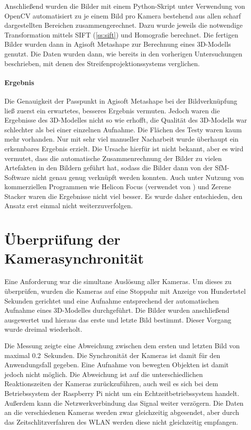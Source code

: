 \documentclass[./00PhotoBox.tex]{subfiles}
\begin{document}
Anschließend wurden die Bilder mit einem Python-Skript unter Verwendung von OpenCV automatisiert zu je einem Bild pro Kamera bestehend aus allen scharf dargestellten Bereichen zusammengerechnet. Dazu wurde jeweils die notwendige Transformation mittels \Gls{SIFT} (\autoref{ss:sift}) und \Gls{Homografie} berechnet. Die fertigen Bilder wurden dann in Agisoft Metashape zur Berechnung eines 3D-Modells genutzt. Die Daten wurden dann, wie bereits in den vorherigen Untersuchungen beschrieben, mit denen des Streifenprojektionssystems verglichen.

\paragraph{Ergebnis}
Die Genauigkeit der Passpunkt in Agisoft Metashape bei der Bildverknüpfung ließ zuerst ein erwartetes, besseres Ergebnis vermuten. Jedoch waren die Ergebnisse des 3D-Modelles nicht so wie erhofft, die Qualität des 3D-Modells war schlechter als bei einer einzelnen Aufnahme. Die Flächen des Testy waren kaum mehr vorhanden. Nur mit sehr viel manueller Nacharbeit wurde überhaupt ein erkennbares Ergebnis erzielt. Die Ursache hierfür ist nicht bekannt, aber es wird vermutet, dass die automatische Zusammenrechnung der Bilder zu vielen Artefakten in den Bildern geführt hat, sodass die Bilder dann von der \Gls{SfM}-Software nicht genau genug verknüpft werden konnten. Auch unter Nutzung von kommerziellen Programmen wie Helicon Focus (verwendet von \cite{focusstack_sfm}) und Zerene Stacker waren die Ergebnisse nicht viel besser. Es wurde daher entschieden, den Ansatz erst einmal nicht weiterzuverfolgen.

\section{Überprüfung der Kamerasynchronität}
\label{s:kamerasynchronitaet}
Eine Anforderung war die simultane Auslösung aller Kameras. Um dieses zu überprüfen, wurden die Kameras auf eine Stoppuhr mit Anzeige von Hundertstel Sekunden gerichtet und eine Aufnahme entsprechend der automatischen Aufnahme eines 3D-Modelles durchgeführt. Die Bilder wurden anschließend ausgewertet und hieraus das erste und letzte Bild bestimmt. Dieser Vorgang wurde dreimal wiederholt.

Die Messung zeigte eine Abweichung zwischen dem ersten und letzten Bild von maximal \SI{0,2}{Sekunden}. Die Synchronität der Kameras ist damit für den Anwendungsfall gegeben. Eine Aufnahme von bewegten Objekten ist damit jedoch nicht möglich. Die Abweichung ist auf die unterschiedlichen Reaktionszeiten der Kameras zurückzuführen, auch weil es sich bei dem Betriebssystem der Raspberry Pi nicht um ein Echtzeitbetriebssystem handelt. Außerdem kann die Netzwerkverbindung das Signal weiter verzögern. Die Daten an die verschiedenen Kameras werden zwar gleichzeitig abgesendet, aber durch das Zeitschlitzverfahren des WLAN werden diese nicht gleichzeitig empfangen.

\biblio
\end{document}
